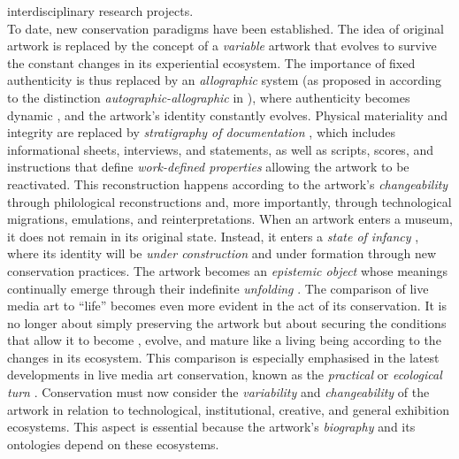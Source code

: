 interdisciplinary research projects.\\
To date, new conservation paradigms have been established. The idea of original artwork is replaced by the concept of a \textit{variable} artwork \cite{depocas2003variable} that evolves to survive the constant changes in its experiential ecosystem. The importance of fixed authenticity is thus replaced by an \textit{allographic} system (as proposed in \cite{laurenson2004management} according to the distinction \textit{autographic-allographic} in \cite{goodman1968languages}), where authenticity becomes dynamic \cite{innocenti2012bridging, innocenti2012rethinking}, and the artwork’s identity constantly evolves. Physical materiality and integrity are replaced by \textit{stratigraphy of documentation} \cite{holling2016aesthetics}, which includes informational sheets, interviews, and statements, as well as scripts, scores, and instructions that define \textit{work-defined properties} \cite{laurenson2006authenticity} allowing the artwork to be reactivated. This reconstruction happens according to the artwork’s \textit{changeability} \cite{holling2017paik} through philological reconstructions and, more importantly, through technological migrations, emulations, and reinterpretations. When an artwork enters a museum, it does not remain in its original state. Instead, it enters a \textit{state of infancy} \cite{phillips2015reporting}, where its identity will be \textit{under construction} \cite{dekker2022documentation} and under formation \cite{phillips2015reporting} through new conservation practices. The artwork becomes an \textit{epistemic object} whose meanings continually emerge through their indefinite \textit{unfolding} \cite{laurenson2016practices}. The comparison of live media art to ``life'' becomes even more evident in the act of its conservation. It is no longer about simply preserving the artwork but about securing the conditions that allow it to become \cite{butler2018my, castriota2019authenticity}, evolve, and mature like a living being according to the changes in its ecosystem. This comparison is especially emphasised in the latest developments in live media art conservation, known as the \textit{practical} or \textit{ecological turn} \cite{van2023theories}. Conservation must now consider the \textit{variability} and \textit{changeability} of the artwork in relation to technological, institutional, creative, and general exhibition ecosystems. This aspect is essential because the artwork’s \textit{biography} \cite{van2011reflections} and its ontologies depend on these ecosystems.\\
